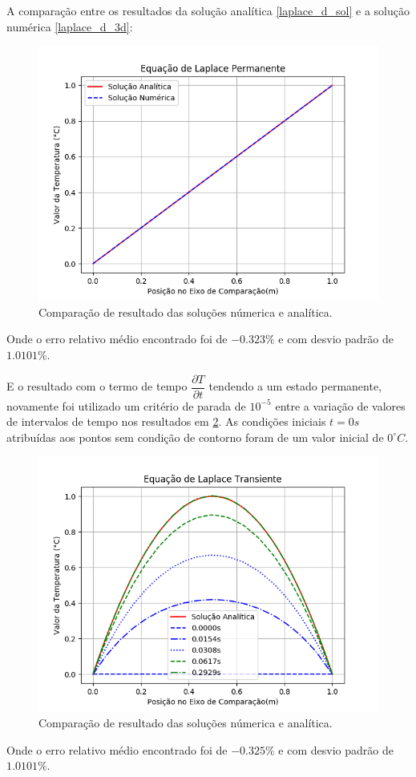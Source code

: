A comparação entre os resultados da solução analítica \ref{laplace_d_sol} e a solução numérica \ref{laplace_d_3d}:
\begin{figure}[H]
    \centering
    \includegraphics[width=.7\linewidth]{figures/laplace_dirichlet_permanent_comparison.png}
    \caption{Comparação de resultado das soluções númerica e analítica.}
    \label{poisson_d_perm_comp}
\end{figure}
Onde o erro relativo médio encontrado foi de $-0.323\%$ e com desvio padrão de $1.0101\%$.

E o resultado com o termo de tempo $\dfrac{\partial T}{\partial t}$ tendendo a um estado permanente, novamente foi utilizado um critério de parada de $10^{-5}$ entre a variação de valores de intervalos de tempo nos resultados em \ref{poisson_d_trans_comp}.
As condições iniciais $t=0s$ atribuídas aos pontos sem condição de contorno foram de um valor inicial de $0^{\circ}C$.

\begin{figure}[H]
    \centering
    \includegraphics[width=.7\linewidth]{figures/poisson_dirichlet_transient_comparison.png}
    \caption{Comparação de resultado das soluções númerica e analítica.}
    \label{poisson_d_trans_comp}
\end{figure}
Onde o erro relativo médio encontrado foi de $-0.325\%$ e com desvio padrão de $1.0101\%$.
